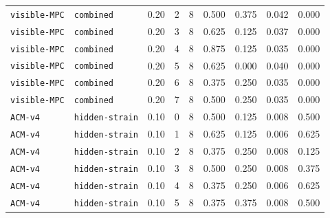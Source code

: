 \documentclass{article}
\begin{document}
\begin{center}
\begin{tabular}{llccccccc}
\texttt{visible-MPC} & \texttt{combined} & 0.20 & 2 & 8 & 0.500 & 0.375 & 0.042 & 0.000 \\
\texttt{visible-MPC} & \texttt{combined} & 0.20 & 3 & 8 & 0.625 & 0.125 & 0.037 & 0.000 \\
\texttt{visible-MPC} & \texttt{combined} & 0.20 & 4 & 8 & 0.875 & 0.125 & 0.035 & 0.000 \\
\texttt{visible-MPC} & \texttt{combined} & 0.20 & 5 & 8 & 0.625 & 0.000 & 0.040 & 0.000 \\
\texttt{visible-MPC} & \texttt{combined} & 0.20 & 6 & 8 & 0.375 & 0.250 & 0.035 & 0.000 \\
\texttt{visible-MPC} & \texttt{combined} & 0.20 & 7 & 8 & 0.500 & 0.250 & 0.035 & 0.000 \\
\texttt{ACM-v4} & \texttt{hidden-strain} & 0.10 & 0 & 8 & 0.500 & 0.125 & 0.008 & 0.500 \\
\texttt{ACM-v4} & \texttt{hidden-strain} & 0.10 & 1 & 8 & 0.625 & 0.125 & 0.006 & 0.625 \\
\texttt{ACM-v4} & \texttt{hidden-strain} & 0.10 & 2 & 8 & 0.375 & 0.250 & 0.008 & 0.125 \\
\texttt{ACM-v4} & \texttt{hidden-strain} & 0.10 & 3 & 8 & 0.500 & 0.250 & 0.008 & 0.375 \\
\texttt{ACM-v4} & \texttt{hidden-strain} & 0.10 & 4 & 8 & 0.375 & 0.250 & 0.006 & 0.625 \\
\texttt{ACM-v4} & \texttt{hidden-strain} & 0.10 & 5 & 8 & 0.375 & 0.375 & 0.008 & 0.500 \\
\bottomrule
\end{tabular}
\end{center}
\end{document}

